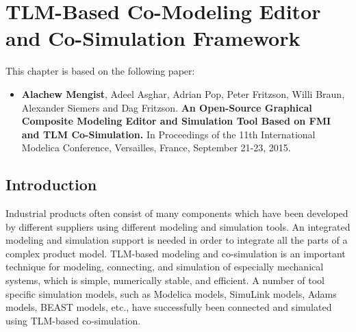 

\chapter{TLM-Based Co-Modeling Editor and Co-Simulation Framework}
\label{cha:tlm}


This chapter is based on the following paper:

\begin{itemize}
	
	
	\item  \textbf{Alachew Mengist}, Adeel Asghar, Adrian Pop, Peter Fritzson, Willi Braun, Alexander Siemers and Dag Fritzson.\textbf{ An Open-Source Graphical Composite Modeling Editor and Simulation Tool Based on FMI and TLM Co-Simulation.} In Proceedings of the 11th International Modelica Conference, Versailles, France, September 21-23, 2015. 
	
\end{itemize}

\section{Introduction}
\label{sec:tlmintroduction}

Industrial products often consist of many components which have been developed by different suppliers
using different modeling and simulation tools. An integrated modeling and simulation support is needed in order to
integrate all the parts of a complex product model. TLM-based modeling and co-simulation is an important technique for
modeling, connecting, and simulation of especially mechanical systems, which is simple, numerically stable, and efficient.
A number of tool specific simulation models, such as Modelica models, SimuLink models, Adams models, BEAST models, etc., 
have successfully been connected and simulated using TLM-based co-simulation.

